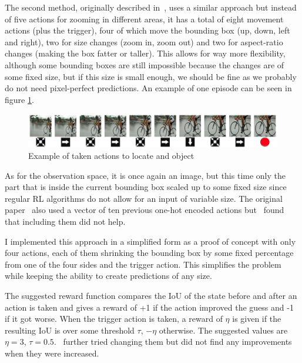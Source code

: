 \documentclass[
  digital,     %
  oneside,     %
  nosansbold,  %
  nocolorbold, %
  lof,         %
  lot,         %
]{fithesis4}
\begin{document}
The second method, originally described in~\cite{iterative_od_with_rl}, uses a similar approach but instead of five actions for zooming in different areas, it has a total of eight movement actions (plus the trigger), four of which move the bounding box (up, down, left and right), two for size changes (zoom in, zoom out) and two for aspect-ratio changes (making the box fatter or taller). This allows for way more flexibility, although some bounding boxes are still impossible because the changes are of some fixed size, but if this size is small enough, we should be fine as we probably do not need pixel-perfect predictions. An example of one episode can be seen in figure \ref{fig:exmaple_from_paper}.

\begin{figure}
    \centering
    \includegraphics[width=1\linewidth]{diagrams/45.jpg}
    \caption{Example of taken actions to locate and object~\cite{iterative_od_with_rl}}
    \label{fig:exmaple_from_paper}
\end{figure}

As for the observation space, it is once again an image, but this time only the part that is inside the current bounding box scaled up to some fixed size since regular RL algorithms do not allow for an input of variable size. The original paper~\cite{iterative_od_with_rl} also used a vector of ten previous one-hot encoded actions but~\cite{rl_object_detection} found that including them did not help.

I implemented this approach in a simplified form as a proof of concept with only four actions, each of them shrinking the bounding box by some fixed percentage from one of the four sides and the trigger action. This simplifies the problem while keeping the ability to create predictions of any size.

The suggested reward function compares the IoU of the state before and after an action is taken and gives a reward of +1 if the action improved the guess and -1 if it got worse. When the trigger action is taken, a reward of $\eta$ is given if the resulting IoU is over some threshold $\tau$, $-\eta$ otherwise. The suggested values are $\eta=3$, $\tau=0.5$.~\cite{rl_object_detection} further tried changing them but did not find any improvements when they were increased.
\end{document}
